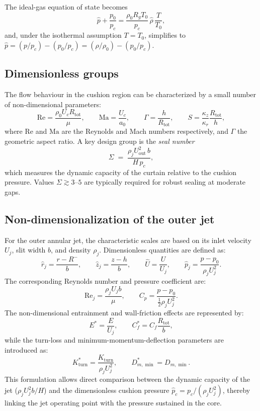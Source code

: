 \documentclass[11pt,a4paper]{article}
\begin{document}
The ideal-gas equation of state becomes
\[
\hat{p} + \frac{p_0}{p_c} = \frac{\rho_0 R_g T_0}{p_c} 
\, \hat{\rho} \, \frac{T}{T_0},
\]
and, under the isothermal assumption \(T = T_0\), simplifies to 
\(\hat{p} = (p/p_c) - (p_0/p_c) = (\rho / \rho_0) - (p_0/p_c)\).

\subsection{Dimensionless groups}

The flow behaviour in the cushion region can be characterized by a small number of non-dimensional parameters:
\[
\mathrm{Re} = \frac{\rho_0 U_c R_{\mathrm{tot}}}{\mu}, \qquad
\mathrm{Ma} = \frac{U_c}{a_0}, \qquad
\Gamma = \frac{h}{R_{\mathrm{tot}}}, \qquad
S = \frac{\kappa_z}{\kappa_r} \frac{R_{\mathrm{tot}}}{h},
\]
where \(\mathrm{Re}\) and \(\mathrm{Ma}\) are the Reynolds and Mach numbers respectively, and \(\Gamma\) the geometric aspect ratio.
A key design group is the \emph{seal number}
\begin{equation}
\Sigma \;=\; \frac{\rho_j U_{\mathrm{out}}^2\,b}{H\,p_c},
\end{equation}
which measures the dynamic capacity of the curtain relative to the cushion pressure.
Values $\Sigma \gtrsim 3$--$5$ are typically required for robust sealing at moderate gaps.

\subsection{Non-dimensionalization of the outer jet}

For the outer annular jet, the characteristic scales are based on its inlet velocity \(U_j\), slit width \(b\), and density \(\rho_j\).  
Dimensionless quantities are defined as:
\[
\hat{r}_j = \frac{r - R^{-}}{b}, \qquad
\hat{z}_j = \frac{z - h}{b}, \qquad
\hat{U} = \frac{U}{U_j}, \qquad
\hat{p}_j = \frac{p - p_0}{\rho_j U_j^2}.
\]
The corresponding Reynolds number and pressure coefficient are:
\[
\mathrm{Re}_j = \frac{\rho_j U_j b}{\mu}, \qquad
C_p = \frac{p - p_0}{\tfrac{1}{2}\rho_j U_j^2}.
\]
The non-dimensional entrainment and wall-friction effects are represented by:
\[
E^* = \frac{E}{U_j}, \qquad
C_f^* = C_f \frac{R_{\mathrm{tot}}}{b},
\]
while the turn-loss and minimum-momentum-deflection parameters are introduced as:
\[
K_{\mathrm{turn}}^* = \frac{K_{\mathrm{turn}}}{\rho_j U_j^2}, \qquad
D_{m,\min}^* = D_{m,\min}.
\]
This formulation allows direct comparison between the dynamic capacity of the jet
(\(\rho_j U_j^2 b / H\)) and the dimensionless cushion pressure \(\hat{p}_c = p_c / (\rho_j U_j^2)\),
thereby linking the jet operating point with the pressure sustained in the core.
\end{document}
